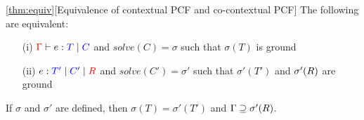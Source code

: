 \documentclass{llncs}
\begin{document}
\begin{customtheorem}{\ref{thm:equiv}}[Equivalence of contextual PCF and co-contextual PCF] 
The following are equivalent:
\vspace{-1ex}
\begin{enumerate}
\item[(i)] $\judgeC{\Gamma}{e}{T}{C}$ and
  $\mathit{solve}(C)=\sigma$ such that $\sigma(T)$ is ground
\item[(ii)] $\cojudge{e}{T'}{C'}{\reqs}$ and
  $\mathit{solve}(C')=\sigma'$ such that $\sigma'(T') $ and $\sigma'(R)$ are ground
\end{enumerate}
\vspace{-1ex}
  If $\sigma$ and $\sigma'$ are defined, then $\sigma(T) = \sigma'(T')$ and
  $\Gamma \supseteq \sigma'(R)$.
\end{customtheorem}
\end{document}
